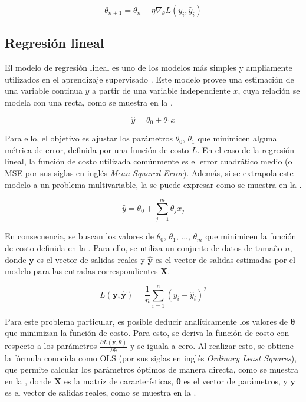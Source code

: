 \begin{equation}
    \label{eq:sgd}
    \theta_{n+1} = \theta_n - \eta \nabla_{\theta} L(y_i, \hat{y}_i)
\end{equation}

\subsection{Regresión lineal}
\label{sec:regresion_lineal}
El modelo de regresión lineal es uno de los modelos más simples y ampliamente utilizados en el aprendizaje supervisado \cite{Hastie2009}. Este modelo provee una estimación de una variable continua $y$ a partir de una variable independiente $x$, cuya relación se modela con una recta, como se muestra en la .

\begin{equation}
    \label{eq:linear_regression}
    \hat{y} = \theta_0 + \theta_1 x
\end{equation}

Para ello, el objetivo es ajustar los parámetros $\theta_0$, $\theta_1$ que minimicen alguna métrica de error, definida por una función de costo $L$. En el caso de la regresión lineal, la función de costo utilizada comúnmente es el error cuadrático medio (o MSE por sus siglas en inglés \textit{Mean Squared Error}). Además, si se extrapola este modelo a un problema multivariable, la  se puede expresar como se muestra en la .

\begin{equation}
    \label{eq:linear_regression_multivariable}
    \hat{y} = \theta_0 + \sum_{j=1}^{m} \theta_j x_j
\end{equation}

En consecuencia, se buscan los valores de $\theta_0$, $\theta_1$, ..., $\theta_m$ que minimicen la función de costo definida en la . Para ello, se utiliza un conjunto de datos de tamaño $n$, donde $\mathbf{y}$ es el vector de salidas reales y $\hat{\mathbf{y}}$ es el vector de salidas estimadas por el modelo para las entradas correspondientes $\mathbf{X}$.

\begin{equation}
    \label{eq:mse}
    L(\mathbf{y}, \hat{\mathbf{y}}) = \frac{1}{n} \sum_{i=1}^{n} \left(y_i - \hat{y}_i\right)^2
\end{equation}

Para este problema particular, es posible deducir analíticamente los valores de $\mathbf{\theta}$ que minimizan la función de costo. Para esto, se deriva la función de costo con respecto a los parámetros $\frac{\partial L(\mathbf{y}, \hat{\mathbf{y}})}{\partial \mathbf{\theta}}$ y se iguala a cero. Al realizar esto, se obtiene la fórmula conocida como OLS (por sus siglas en inglés \textit{Ordinary Least Squares}), que permite calcular los parámetros óptimos de manera directa, como se muestra en la , donde $\mathbf{X}$ es la matriz de características, $\mathbf{\theta}$ es el vector de parámetros, y $\mathbf{y}$ es el vector de salidas reales, como se muestra en la .

